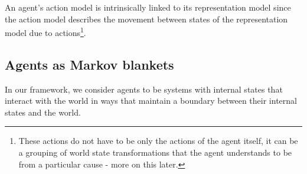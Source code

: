 An agent's action model is intrinsically linked to its representation model since the action model describes the movement between states of the representation model due to actions\footnote{These actions do not have to be only the actions of the agent itself, it can be a grouping of world state transformations that the agent understands to be from a particular cause - more on this later.}.



\subsection{Agents as Markov blankets}

In our framework, we consider agents to be systems with internal states that interact with the world in ways that maintain a boundary between their internal states and the world.

